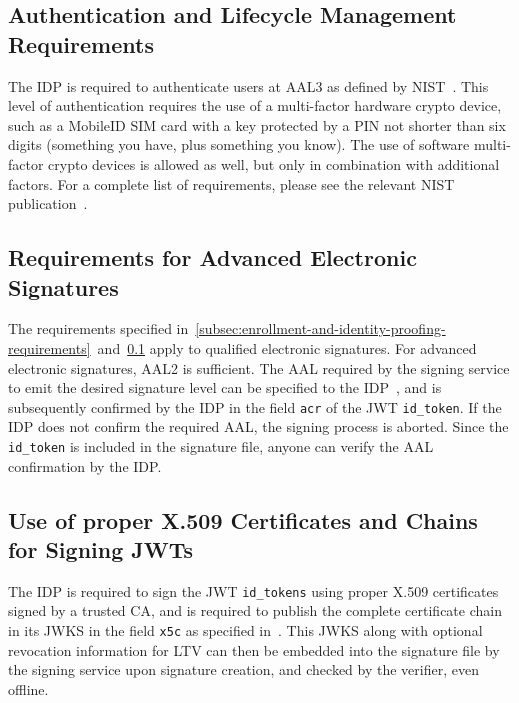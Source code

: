 \subsection{Authentication and Lifecycle Management Requirements}\label{subsec:authentication-and-lifecycle-management-requirements}
The \gls{IDP} is required to authenticate users at \gls{AAL3} as defined by \gls{NIST}~\cite{nistauthenticate}.
This level of authentication requires the use of a multi-factor hardware crypto device,
such as a MobileID \gls{SIM} card with a key protected by a \gls{PIN} not shorter than six digits
(something you have, plus something you know).
The use of software multi-factor crypto devices is allowed as well, but only in combination with additional factors.
For a complete list of requirements, please see the relevant \gls{NIST} publication~\cite{nistauthenticate}.

\subsection{Requirements for Advanced Electronic Signatures}\label{subsec:requirements-for-advanced-electronic-signatures}
The requirements specified in~\ref{subsec:enrollment-and-identity-proofing-requirements}~and~\ref{subsec:authentication-and-lifecycle-management-requirements} apply to qualified electronic signatures.
For advanced electronic signatures, \gls{AAL2} is sufficient.
The \gls{AAL} required by the signing service to emit the desired signature level can be specified to the \gls{IDP}~\cite[Section 2]{oidc-core-spec},
and is subsequently confirmed by the \gls{IDP} in the field \texttt{acr} of the \gls{JWT} \texttt{id\_token}.
If the \gls{IDP} does not confirm the required \gls{AAL}, the signing process is aborted.
Since the \texttt{id\_token} is included in the signature file, anyone can verify the \gls{AAL} confirmation by the \gls{IDP}.

\subsection{Use of proper X.509 Certificates and Chains for Signing JWTs}\label{subsec:use-of-x.509-for-signing-jwts}
The \gls{IDP} is required to sign the \gls{JWT} \texttt{id\_tokens} using proper X.509 certificates
signed by a trusted \gls{CA}, and is required to publish the complete certificate chain in its \gls{JWKS}
in the field \texttt{x5c} as specified in~\cite[RFC 7515, Section 4.1.6]{rfc7515}.
This \gls{JWKS} along with optional revocation information for \gls{LTV} can then be embedded into the signature file
by the signing service upon signature creation, and checked by the verifier, even offline.

